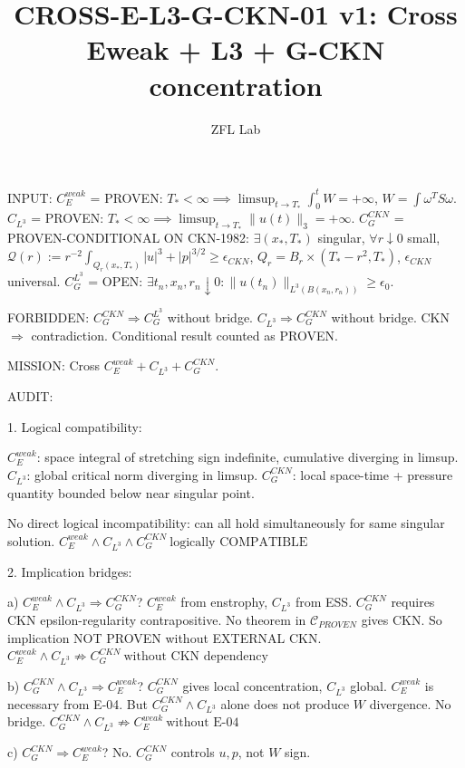 \documentclass[11pt]{article}
\title{CROSS-E-L3-G-CKN-01 v1: Cross Eweak + L3 + G-CKN concentration}
\author{ZFL Lab}
\begin{document}
\maketitle

INPUT:
$C_E^{weak}$ = PROVEN: $T_*<\infty\implies \limsup_{t\to T_*}\int_0^t W = +\infty$, $W=\int \omega^T S\omega$.
$C_{L^3}$ = PROVEN: $T_*<\infty\implies \limsup_{t\to T_*}\|u(t)\|_3=+\infty$.
$C_G^{CKN}$ = PROVEN-CONDITIONAL ON CKN-1982: $\exists (x_*,T_*)$ singular, $\forall r\downarrow0$ small, $\mathcal{Q}(r):=r^{-2}\int_{Q_r(x_*,T_*)}|u|^3+|p|^{3/2}\ge\epsilon_{CKN}$, $Q_r=B_r\times(T_*-r^2,T_*)$, $\epsilon_{CKN}$ universal.
$C_G^{L^3}$ = OPEN: $\exists t_n,x_n,r_n\downarrow0: \|u(t_n)\|_{L^3(B(x_n,r_n))}\ge\epsilon_0$.

FORBIDDEN:
$C_G^{CKN}\Rightarrow C_G^{L^3}$ without bridge.
$C_{L^3}\Rightarrow C_G^{CKN}$ without bridge.
CKN $\Rightarrow$ contradiction.
Conditional result counted as PROVEN.

MISSION: Cross $C_E^{weak}+C_{L^3}+C_G^{CKN}$.

AUDIT:

1. Logical compatibility:

$C_E^{weak}$: space integral of stretching sign indefinite, cumulative diverging in limsup.
$C_{L^3}$: global critical norm diverging in limsup.
$C_G^{CKN}$: local space-time + pressure quantity bounded below near singular point.

No direct logical incompatibility: can all hold simultaneously for same singular solution.
$\boxed{C_E^{weak}\land C_{L^3}\land C_G^{CKN}\ \text{logically COMPATIBLE}}$

2. Implication bridges:

a) $C_E^{weak}\land C_{L^3}\Rightarrow C_G^{CKN}$?
$C_E^{weak}$ from enstrophy, $C_{L^3}$ from ESS. $C_G^{CKN}$ requires CKN epsilon-regularity contrapositive. No theorem in $\mathcal{C}_{PROVEN}$ gives CKN. So implication NOT PROVEN without EXTERNAL CKN.
$\boxed{C_E^{weak}\land C_{L^3}\not\Rightarrow C_G^{CKN}\ \text{without CKN dependency}}$

b) $C_G^{CKN}\land C_{L^3}\Rightarrow C_E^{weak}$?
$C_G^{CKN}$ gives local concentration, $C_{L^3}$ global. $C_E^{weak}$ is necessary from E-04. But $C_G^{CKN}\land C_{L^3}$ alone does not produce $W$ divergence. No bridge.
$\boxed{C_G^{CKN}\land C_{L^3}\not\Rightarrow C_E^{weak}\ \text{without E-04}}$

c) $C_G^{CKN}\Rightarrow C_E^{weak}$? No. $C_G^{CKN}$ controls $u,p$, not $W$ sign.
\end{document}
